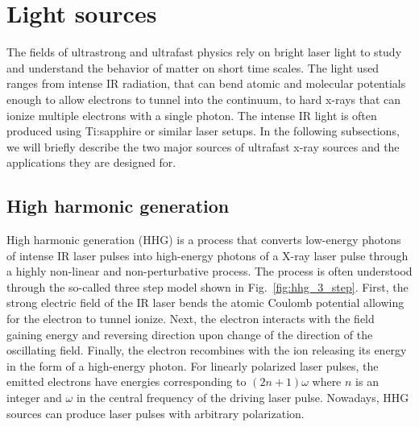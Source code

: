 \section{Light sources}

The fields of ultrastrong and ultrafast physics rely on bright laser light to study and understand the behavior of matter on short time scales. The light used ranges from intense IR radiation, that can bend atomic and molecular potentials enough to allow electrons to tunnel into the continuum, to hard x-rays that can ionize multiple electrons with a single photon. The intense IR light is often produced  using Ti:sapphire or similar laser setups. In the following subsections, we will briefly describe the two major sources of ultrafast x-ray sources and the applications they are designed for.

\subsection{High harmonic generation} %
\label{sub:high_harmonic_generation}
High harmonic generation (HHG) is a process that converts low-energy photons of intense IR laser pulses into high-energy photons of a X-ray laser pulse through a highly non-linear and non-perturbative process. The process is often understood through the so-called three step model shown in Fig.~\ref{fig:hhg_3_step}. First, the strong electric field of the IR laser bends the atomic Coulomb potential allowing for the electron to tunnel ionize. Next, the electron interacts with the field gaining energy and reversing direction upon change of the direction of the oscillating field. Finally, the electron recombines with the ion releasing its energy in the form of a high-energy photon. For linearly polarized laser pulses, the emitted electrons have energies corresponding to $(2n+1)\omega$ where $n$ is an integer and $\omega$ in the central frequency of the driving laser pulse. Nowadays, HHG sources can produce laser pulses with arbitrary polarization.

